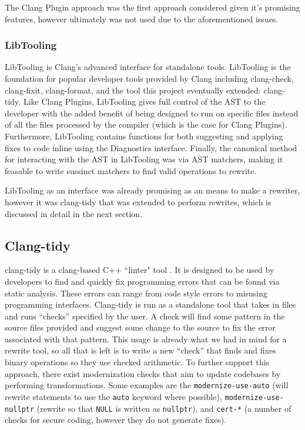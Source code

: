 The Clang Plugin approach was the first approach considered given it's promising features, however ultimately was not used due to the aforementioned issues.

\subsubsection{LibTooling}

LibTooling is Clang's advanced interface for standalone tools. LibTooling is the foundation for popular developer tools provided by Clang including clang-check, clang-fixit, clang-format, and the tool this project eventually extended: clang-tidy. Like Clang Plugins, LibTooling gives full control of the AST to the developer with the added benefit of being designed to run on specific files instead of all the files processed by the compiler (which is the case for Clang Plugins). Furthermore, LibTooling contains functions for both suggesting and applying fixes to code inline using the Diagnostics interface. Finally, the canonical method for interacting with the AST in LibTooling was via AST matchers, making it feasable to write sussinct matchers to find valid operations to rewrite.

LibTooling as an interface was already promising as an means to make a rewriter, however it was clang-tidy that was extended to perform rewrites, which is discussed in detail in the next section.

\subsection{Clang-tidy}

clang-tidy is a clang-based C++ ``linter" tool \cite{clang-tidy}. It is designed to be used by developers to find and quickly fix programming errors that can be found via static analysis. These errors can range from code style errors to misusing programming interfaces. Clang-tidy is run as a standalone tool that takes in files and runs ``checks'' specified by the user. A check will find some pattern in the source files provided and suggest some change to the source to fix the error associated with that pattern. This usage is already what we had in mind for a rewrite tool, so all that is left is to write a new ``check'' that finds and fixes binary operations so they use checked arithmetic. To further support this approach, there exist modernization checks that aim to update codebases by performing transformations. Some examples are the \texttt{modernize-use-auto} (will rewrite statements to use the \texttt{auto} keyword where possible), \texttt{modernize-use-nullptr} (rewrite so that \texttt{NULL} is written as \texttt{nullptr}), and \texttt{cert-*} (a number of checks for secure coding, however they do not generate fixes).

